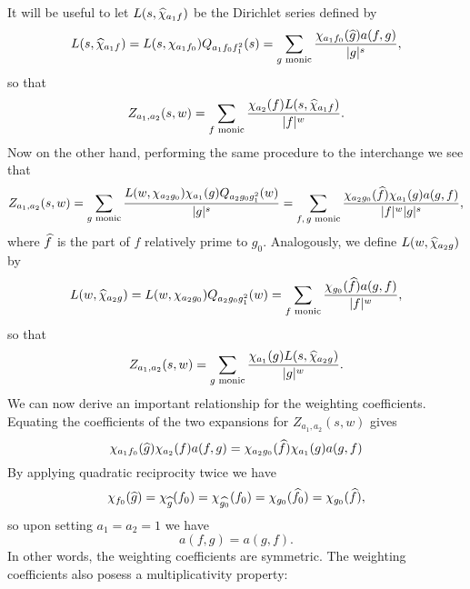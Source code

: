 \documentclass[12pt,reqno,oneside]{amsart}
\begin{document}
    It will be useful to let $L(s,\widehat{\chi}_{a_{1}f})$ be the Dirichlet series defined by
    \[
        L(s,\widehat{\chi}_{a_{1}f}) = L(s,\chi_{a_{1}f_{0}})Q_{a_{1}f_{0}f_{1}^{2}}(s) = \sum_{\text{$g$ monic}}\frac{\chi_{a_{1}f_{0}}(\widehat{g})a(f,g)}{|g|^{s}},
    \]
    so that
    \[
        Z_{a_{1},a_{2}}(s,w) = \sum_{\text{$f$ monic}}\frac{\chi_{a_{2}}(f)L(s,\widehat{\chi}_{a_{1}f})}{|f|^{w}}.
    \]
     Now on the other hand, performing the same procedure to the interchange we see that
    \[
        Z_{a_{1},a_{2}}(s,w) = \sum_{\text{$g$ monic}}\frac{L(w,\chi_{a_{2}g_{0}})\chi_{a_{1}}(g)Q_{a_{2}g_{0}g_{1}^{2}}(w)}{|g|^{s}} = \sum_{\text{$f,g$ monic}}\frac{\chi_{a_{2}g_{0}}(\widehat{f})\chi_{a_{1}}(g)a(g,f)}{|f|^{w}|g|^{s}},
    \]
    where $\widehat{f}$ is the part of $f$ relatively prime to $g_{0}$. Analogously, we define $L(w,\widehat{\chi}_{a_{2}g})$ by
    \[
        L(w,\widehat{\chi}_{a_{2}g}) = L(w,\chi_{a_{2}g_{0}})Q_{a_{2}g_{0}g_{1}^{2}}(w) = \sum_{\text{$f$ monic}}\frac{\chi_{g_{0}}(\widehat{f})a(g,f)}{|f|^{w}},
    \]
    so that
    \[
        Z_{a_{1},a_{2}}(s,w) = \sum_{\text{$g$ monic}}\frac{\chi_{a_{1}}(g)L(s,\widehat{\chi}_{a_{2}g})}{|g|^{w}}.
    \]
    We can now derive an important relationship for the weighting coefficients. Equating the coefficients of the two expansions for $Z_{a_{1},a_{2}}(s,w)$ gives
    \[
        \chi_{a_{1}f_{0}}(\widehat{g})\chi_{a_{2}}(f)a(f,g) = \chi_{a_{2}g_{0}}(\widehat{f})\chi_{a_{1}}(g)a(g,f)
    \]
    By applying quadratic reciprocity twice we have
    \[
        \chi_{f_{0}}(\widehat{g}) = \chi_{\widehat{g}}(f_{0}) = \chi_{\widehat{g_{0}}}(f_{0}) = \chi_{g_{0}}(\widehat{f_{0}}) = \chi_{g_{0}}(\widehat{f}),
    \]
    so upon setting $a_{1} = a_{2} = 1$ we have
    \[
        a(f,g) = a(g,f).
    \]
    In other words, the weighting coefficients are symmetric. The weighting coefficients also posess a multiplicativity property:
\end{document}
